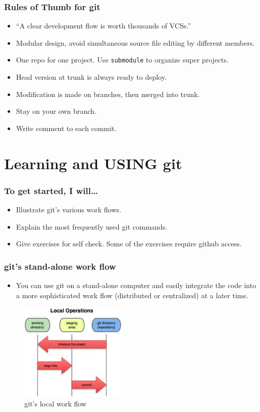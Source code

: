\documentclass[11pt,ignorenonframetext,]{beamer}
\begin{document}
\begin{frame}\frametitle{Rules of Thumb for git}

\begin{itemize}
\item
  ``A clear development flow is worth thousands of VCSs.''
\item
  Modular design, avoid simultaneous source file editing by different
  members.
\item
  One repo for one project. Use \texttt{submodule} to organize super
  projects.
\item
  Head version at trunk is always ready to deploy.
\item
  Modification is made on branches, then merged into trunk.
\item
  Stay on your own branch.
\item
  Write comment to each commit.
\end{itemize}
\end{frame}

\section{Learning and USING git}

\begin{frame}\frametitle{To get started, I will\ldots{}}

\begin{itemize}
\item
  Illustrate git's various work flows.
\item
  Explain the most frequently used git commands.
\item
  Give exercises for self check. Some of the exercises require github
  access.
\end{itemize}
\end{frame}

\begin{frame}\frametitle{git's stand-alone work flow}

\begin{itemize}
\item
  You can use git on a stand-alone computer and easily integrate the
  code into a more sophisticated work flow (distributed or centralized)
  at a later time.
\end{itemize}
\begin{figure}[htbp]
\centering
\includegraphics[width=0.45\textwidth]{figures/gitstandalone.jpeg}
\caption{git's local work flow}
\end{figure}

\end{frame}
\end{document}
